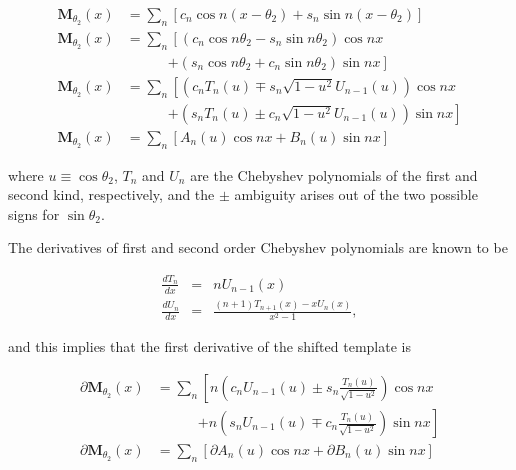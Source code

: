 \documentclass[iop]{emulateapj}
\newcommand{\Mshft}{\mathbf{M}_{\theta_2}}
\newcommand{\dMshft}{\partial\Mshft}
\newcommand{\dA}{\partial A}
\newcommand{\dB}{\partial B}
\begin{document}
\begin{equation}
\begin{split}
    \Mshft(x) &= \sum_n \left[c_n\cos{n(x - \theta_2)} + s_n\sin{n(x - \theta_2)}\right]\\
    \Mshft(x) &= \sum_n \left[\left(c_n\cos{n\theta_2} - s_n\sin{n\theta_2}\right)\cos{nx} \right.\\
              &\qquad\quad \left. + \left(s_n\cos{n\theta_2} + c_n\sin{n\theta_2}\right)\sin{nx}\right]\\
    \Mshft(x) &= \sum_n \left[\left(c_nT_n(u) \mp s_n\sqrt{1 - u^2}U_{n-1}(u)\right)\cos{nx} \right.\\
              &\qquad\quad \left. + \left(s_nT_n(u) \pm c_n\sqrt{1 - u^2}U_{n-1}(u)\right)\sin{nx}\right]\\
    \Mshft(x) &= \sum_n \left[A_n(u)\cos{nx} + B_n(u)\sin{nx}\right]
\end{split}
\end{equation}

\noindent where $u \equiv \cos \theta_2$, $T_n$ and $U_n$ are the Chebyshev polynomials 
of the first and second kind, respectively, and the $\pm$ ambiguity arises out of the
two possible signs for $\sin{\theta_2}$.

The derivatives of first and second order Chebyshev polynomials are known to be

\begin{eqnarray}
\frac{dT_n}{dx} &=& nU_{n-1}(x)\\
\frac{dU_n}{dx} &=& \frac{(n+1)T_{n+1}(x) - xU_n(x)}{x^2 - 1},
\end{eqnarray}

\noindent and this implies that the first derivative of the shifted template is

\begin{equation}
\begin{split}
\dMshft(x) &= \sum_n \left[n\left(c_nU_{n-1}(u) \pm s_n\frac{T_n(u)}{\sqrt{1 - u^2}}\right)\cos{nx} \right.\\
           &\qquad\quad \left. + n\left(s_nU_{n-1}(u) \mp c_n\frac{T_n(u)}{\sqrt{1 - u^2}}\right)\sin{nx}\right]\\
\dMshft(x) &= \sum_n \left[\dA_n(u) \cos{nx} + \dB_n(u) \sin{nx}\right]
\end{split}
\end{equation}
\end{document}

